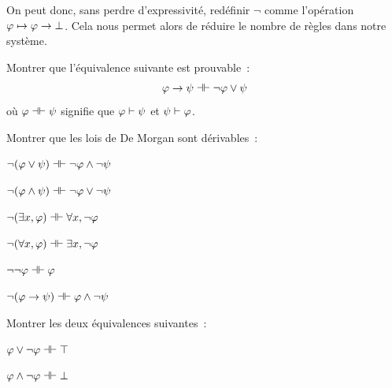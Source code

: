On peut donc, sans perdre d'expressivité, redéfinir $\lnot$ comme l'opération
$\varphi \mapsto \varphi \to \bot$.
Cela nous permet alors de réduire le nombre de règles dans notre système.

\begin{exercise}
  Montrer que l'équivalence suivante est prouvable~:
  \[\varphi \to \psi \mathrel{\mathord{\dashv}\mathord{\vdash}} \lnot \varphi \lor \psi\]
  où $\varphi \mathrel{\mathord{\dashv}\mathord{\vdash}} \psi$ signifie que $\varphi\vdash \psi$ et
  $\psi\vdash \varphi$.
\end{exercise}

\begin{exercise}[De Morgan]
  Montrer que les lois de De Morgan sont dérivables~:
  \begin{itemize}
    \begin{minipage}{0.4\textwidth}
    \item $\lnot (\varphi \lor \psi) \mathrel{\mathord{\dashv}\mathord{\vdash}} \lnot \varphi \land \lnot \psi$
    \item $\lnot (\varphi \land \psi) \mathrel{\mathord{\dashv}\mathord{\vdash}} \lnot \varphi \lor \lnot \psi$
    \item $\lnot (\exists x, \varphi) \mathrel{\mathord{\dashv}\mathord{\vdash}} \forall x, \lnot \varphi$
    \end{minipage}
    \begin{minipage}{0.4\textwidth}
    \item $\lnot (\forall x, \varphi) \mathrel{\mathord{\dashv}\mathord{\vdash}} \exists x, \lnot \varphi$
    \item $\lnot\lnot \varphi \mathrel{\mathord{\dashv}\mathord{\vdash}} \varphi$
    \item $\lnot (\varphi\to \psi) \mathrel{\mathord{\dashv}\mathord{\vdash}} \varphi \land \lnot \psi$
    \end{minipage}
  \end{itemize}
\end{exercise}

\begin{exercise}
  Montrer les deux équivalences suivantes~:
  \begin{itemize}
    \begin{minipage}{0.4\textwidth}
    \item $\varphi \lor \lnot \varphi \mathrel{\mathord{\dashv}\mathord{\vdash}} \top$
    \end{minipage}
    \begin{minipage}{0.4\textwidth}
    \item $\varphi \land \lnot \varphi \mathrel{\mathord{\dashv}\mathord{\vdash}} \bot$
    \end{minipage}
  \end{itemize}
\end{exercise}

